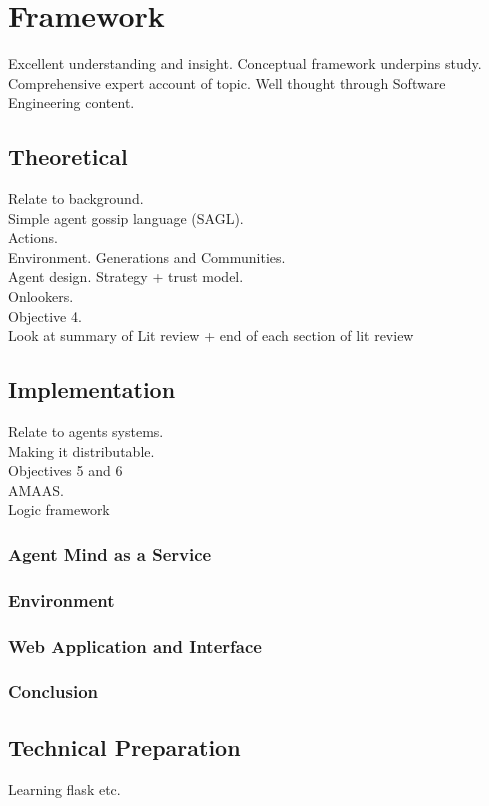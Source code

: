\documentclass[]{final_report}
\begin{document}
\chapter{Framework}
Excellent understanding and insight. Conceptual framework underpins study. Comprehensive expert account of topic. Well thought through Software Engineering content.

\section{Theoretical}
Relate to background.\\
Simple agent gossip language (SAGL).\\
Actions.\\
Environment. Generations and Communities.\\
Agent design. Strategy + trust model.\\
Onlookers.\\
Objective 4.\\
Look at summary of Lit review + end of each section of lit review


\section{Implementation}
Relate to agents systems.\\
Making it distributable.\\
Objectives 5 and 6\\
AMAAS.\\
Logic framework


\subsection{Agent Mind as a Service}
\subsection{Environment}
\subsection{Web Application and Interface}
\subsection{Conclusion}

\section{Technical Preparation}
Learning flask etc.
\end{document}
